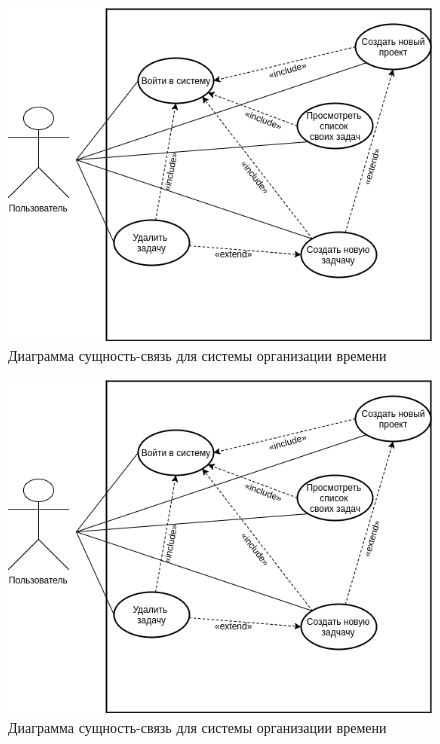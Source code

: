 \begin{figure}[th]
\centering
  \includegraphics[scale=0.5]{images/diagrams/use-case/1.png}  
  \caption{ Диаграмма сущность-связь для системы организации времени }
  \label{fig:domain:todist}
\end{figure}

\begin{figure}[th]
  \centering
  \includegraphics[scale=0.5]{images/diagrams/use-case/1.png}  
  \caption{ Диаграмма сущность-связь для системы организации времени }
  \label{fig:domain:todist}
\end{figure}

